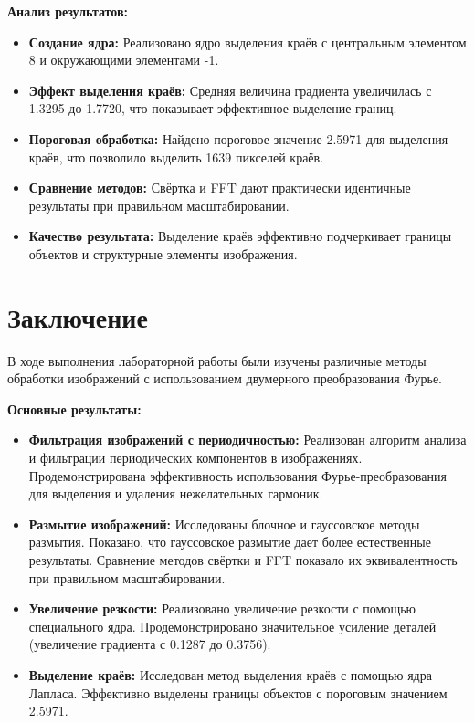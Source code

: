 \textbf{Анализ результатов:}
\begin{itemize}
    \item \textbf{Создание ядра:} Реализовано ядро выделения краёв с центральным элементом 8 и окружающими элементами -1.
    
    \item \textbf{Эффект выделения краёв:} Средняя величина градиента увеличилась с 1.3295 до 1.7720, что показывает эффективное выделение границ.
    
    \item \textbf{Пороговая обработка:} Найдено пороговое значение 2.5971 для выделения краёв, что позволило выделить 1639 пикселей краёв.
    
    \item \textbf{Сравнение методов:} Свёртка и FFT дают практически идентичные результаты при правильном масштабировании.
    
    \item \textbf{Качество результата:} Выделение краёв эффективно подчеркивает границы объектов и структурные элементы изображения.
\end{itemize}

\section*{Заключение}

В ходе выполнения лабораторной работы были изучены различные методы обработки изображений с использованием двумерного преобразования Фурье.

\textbf{Основные результаты:}
\begin{itemize}
    \item \textbf{Фильтрация изображений с периодичностью:} Реализован алгоритм анализа и фильтрации периодических компонентов в изображениях. Продемонстрирована эффективность использования Фурье-преобразования для выделения и удаления нежелательных гармоник.
    
    \item \textbf{Размытие изображений:} Исследованы блочное и гауссовское методы размытия. Показано, что гауссовское размытие дает более естественные результаты. Сравнение методов свёртки и FFT показало их эквивалентность при правильном масштабировании.
    
    \item \textbf{Увеличение резкости:} Реализовано увеличение резкости с помощью специального ядра. Продемонстрировано значительное усиление деталей (увеличение градиента с 0.1287 до 0.3756).
    
    \item \textbf{Выделение краёв:} Исследован метод выделения краёв с помощью ядра Лапласа. Эффективно выделены границы объектов с пороговым значением 2.5971.
\end{itemize}

